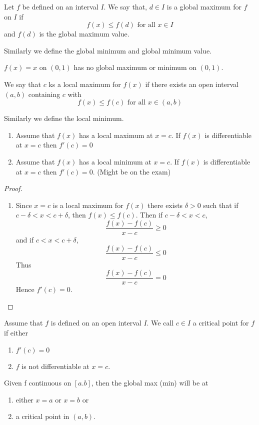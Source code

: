 

\begin{defn}
Let $f$ be defined on an interval $I$. We say that, $d\in I$ is a global maximum for $f$ on $I$ if \[f(x)\leq f(d) \text{ for all } x\in I\] and $f(d)$ is the global maximum value.

Similarly we define the global minimum and global minimum value.
\end{defn}

\begin{exmp}
$f(x) = x$ on $(0,1)$ has no global maximum or minimum on $(0,1)$.
\end{exmp}

\begin{defn}
We say that $c$ ks a local maximum for $f(x)$ if there exists an open interval $(a,b)$ containing $c$ with \[f(x)\leq f(c) \text{ for all }x \in (a,b)\]

Similarly we define the local minimum.
\end{defn}

\begin{thm}\leavevmode

\begin{enumerate}
\item Assume that $f(x)$ has a local maximum at $x=c$. If $f(x)$ is differentiable at $x=c$ then $f'(c) = 0$
\item Assume that $f(x)$ has a local minimum at $x=c$. If $f(x)$ is differentiable at $x=c$ then $f'(c) = 0$. (Might be on the exam)
\end{enumerate}
\end{thm}

\begin{proof}\leavevmode

\begin{enumerate}
    \item Since $x=c$ is  a local maximum for $f(x)$ there exists $\delta > 0$ such that if $c-\delta < x < c+\delta$, then $f(x)\leq f(c)$. Then if $c-\delta < x < c$, \[\frac{f(x) - f(c)}{x-c} \geq 0\] and if $c < x < c+\delta$, \[\frac{f(x) - f(c)}{x-c} \leq 0\] Thus \[\frac{f(x) - f(c)}{x-c} = 0\] Hence $f'(c) = 0$. \qedhere
\end{enumerate}
\end{proof}

\begin{defn}
Assume that $f$ is defined on an open interval $I$. We call $c\in I$ a critical point for $f$ if either \begin{enumerate}
    \item $f'(c) = 0$
    \item $f$ is not differentiable at $x=c$.
\end{enumerate}
\end{defn}

\begin{note}
    Given f continuous on $[a.b]$, then the global max (min) will be at
    \begin{enumerate}
        \item either $x = a$ or $x = b$ or
        \item a critical point in $(a,b)$.
    \end{enumerate}
\end{note}

